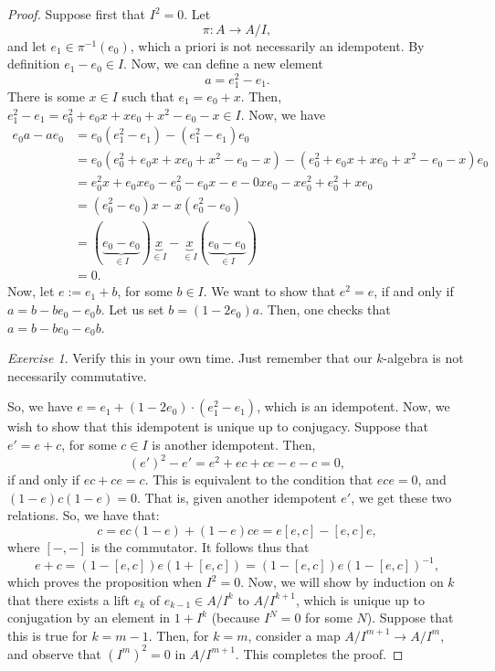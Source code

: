 \documentclass[a4paper]{report}
\theoremstyle{definition}
\theoremstyle{remark}
\theoremstyle{proposition}
\theoremstyle{conjecture}
\theoremstyle{lemma}
\theoremstyle{corollary}
\theoremstyle{exercise}
\newtheorem{exercise}{Exercise}
\theoremstyle{example}
\begin{document}
\begin{proof}
    Suppose first that $I^2 = 0$. Let $$\pi : A \longrightarrow A/I,$$
    and let $e_1 \in \pi^{-1}(e_0)$, which a priori is not necessarily 
    an idempotent. By definition $e_1 - e_0 \in I$. Now, we can define a 
    new element $$a = e_1^2 - e_1.$$ There is some $x\in I$ 
    such that $e_1 = e_0 + x$. Then,
    $e_1^2 - e_1 = e_0^2 + e_0x + xe_0 + x^2-e_0-x \in I$.
    Now, we have
    \begin{align*}
        e_0a - ae_0 &= e_0(e_1^2 - e_1) - (e_1^2-e_1)e_0\\
                    &= e_0(e_0^2 + e_0x + xe_0 + x^2-e_0-x) - (e_0^2 + e_0x + xe_0 + x^2-e_0-x)e_0\\
                    &=e_0^2x + e_0xe_0 - e_0^2 - e_0x - e-0xe_0 - xe_0^2 + e_0^2 +xe_0\\
                    &= (e_0^2-e_0)x - x(e_0^2-e_0)\\
                    &=(\underbrace{e_0-e_0}_{\in I})\underbrace{x}_{\in I} - \underbrace{x}_{\in I}(\underbrace{e_0-e_0}_{\in I})\\
                    &= 0.
    \end{align*}
    Now, let $e := e_1 + b$, for some $b\in I$. We want to show that $e^2 = e$,
    if and only if $a = b-be_0-e_0b$. Let us set $b = (1-2e_0)a$. Then, 
    one checks that $a = b-be_0-e_0b$.
    \begin{exercise}
        Verify this in your own time. Just remember that our $k$-algebra
        is not necessarily commutative.
    \end{exercise}
    So, we have $e = e_1 + (1-2e_0)\cdot (e_1^2-e_1)$, which is an idempotent.
    Now, we wish to show that this idempotent is unique up to conjugacy.
    Suppose that $e' = e + c$, for some $c \in I$ is another idempotent.
    Then,
    $$(e')^2 - e' = e^2 + ec + ce - e -c  = 0,$$
    if and only if $ec + ce = c$. This is equivalent to the condition that 
    $ece = 0$, and $(1-e)c(1-e) = 0$. That is, given another idempotent $e'$,
    we get these two relations. So, we have that:
    $$c = ec(1-e) + (1-e)ce = e[e,c] - [e,c]e,$$
    where $[-,-]$ is the commutator. It follows thus that 
    $$e + c = (1-[e,c])e(1+[e,c]) = (1-[e,c])e(1-[e,c])^{-1},$$
    which proves the proposition when $I^2 = 0$. Now, we will show by 
    induction on $k$ that there exists a lift $e_k$ of $e_{k-1} \in A/I^k$ 
    to $A/I^{k+1}$, which is unique up to conjugation by an element in 
    $1 + I^k$ (because $I^N = 0$ for some $N$). 
    Suppose that this is true for $k = m-1$. Then, for $k = m$, consider a map 
    $A/I^{m+1} \to A/I^m$, and observe that $(I^m)^2 = 0$ in $A/I^{m+1}$.
    This completes the proof.
\end{proof}
\end{document}
